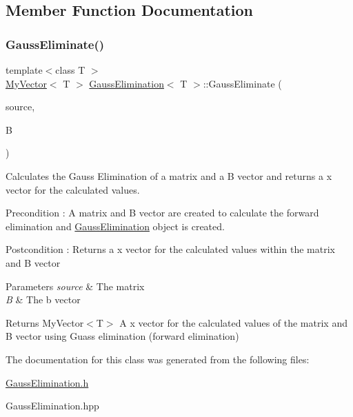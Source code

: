 \subsection{Member Function Documentation}
\mbox{\label{class_gauss_elimination_af4df02b15566a600f527788332deaefa}} 
\subsubsection{\texorpdfstring{GaussEliminate()}{GaussEliminate()}}
{\footnotesize\ttfamily template$<$class T $>$ \\
\mbox{\hyperlink{class_my_vector}{My\+Vector}}$<$ T $>$ \mbox{\hyperlink{class_gauss_elimination}{Gauss\+Elimination}}$<$ T $>$\+::Gauss\+Eliminate (\begin{DoxyParamCaption}\item[{const \mbox{\hyperlink{class_my_vector}{My\+Vector}}$<$ \mbox{\hyperlink{class_my_vector}{My\+Vector}}$<$ T $>$$>$ \&}]{source,  }\item[{const \mbox{\hyperlink{class_my_vector}{My\+Vector}}$<$ T $>$ \&}]{B }\end{DoxyParamCaption})}



Calculates the Gauss Elimination of a matrix and a B vector and returns a x vector for the calculated values. 

\begin{DoxyPrecond}{Precondition}
\+: A matrix and B vector are created to calculate the forward elimination and \mbox{\hyperlink{class_gauss_elimination}{Gauss\+Elimination}} object is created. 
\end{DoxyPrecond}
\begin{DoxyPostcond}{Postcondition}
\+: Returns a x vector for the calculated values within the matrix and B vector 
\end{DoxyPostcond}

\begin{DoxyParams}{Parameters}
{\em source} & The matrix \\
\hline
{\em B} & The b vector \\
\hline
\end{DoxyParams}
\begin{DoxyReturn}{Returns}
My\+Vector$<$\+T$>$ A x vector for the calculated values of the matrix and B vector using Guass elimination (forward elimination) 
\end{DoxyReturn}


The documentation for this class was generated from the following files\+:\begin{DoxyCompactItemize}
\item 
\mbox{\hyperlink{_gauss_elimination_8h}{Gauss\+Elimination.\+h}}\item 
Gauss\+Elimination.\+hpp\end{DoxyCompactItemize}
